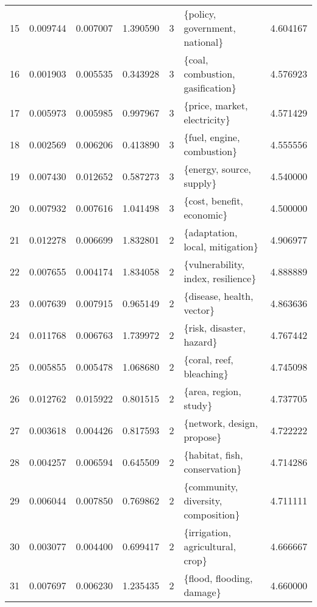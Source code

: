 \begin{tabular}{lrrrrlr}
15 &    0.009744 &  0.007007 &        1.390590 &           3 &          \{policy, government, national\} &  4.604167 \\
16 &    0.001903 &  0.005535 &        0.343928 &           3 &        \{coal, combustion, gasification\} &  4.576923 \\
17 &    0.005973 &  0.005985 &        0.997967 &           3 &            \{price, market, electricity\} &  4.571429 \\
18 &    0.002569 &  0.006206 &        0.413890 &           3 &              \{fuel, engine, combustion\} &  4.555556 \\
19 &    0.007430 &  0.012652 &        0.587273 &           3 &                \{energy, source, supply\} &  4.540000 \\
20 &    0.007932 &  0.007616 &        1.041498 &           3 &               \{cost, benefit, economic\} &  4.500000 \\
21 &    0.012278 &  0.006699 &        1.832801 &           2 &         \{adaptation, local, mitigation\} &  4.906977 \\
22 &    0.007655 &  0.004174 &        1.834058 &           2 &      \{vulnerability, index, resilience\} &  4.888889 \\
23 &    0.007639 &  0.007915 &        0.965149 &           2 &               \{disease, health, vector\} &  4.863636 \\
24 &    0.011768 &  0.006763 &        1.739972 &           2 &                \{risk, disaster, hazard\} &  4.767442 \\
25 &    0.005855 &  0.005478 &        1.068680 &           2 &                \{coral, reef, bleaching\} &  4.745098 \\
26 &    0.012762 &  0.015922 &        0.801515 &           2 &                   \{area, region, study\} &  4.737705 \\
27 &    0.003618 &  0.004426 &        0.817593 &           2 &              \{network, design, propose\} &  4.722222 \\
28 &    0.004257 &  0.006594 &        0.645509 &           2 &           \{habitat, fish, conservation\} &  4.714286 \\
29 &    0.006044 &  0.007850 &        0.769862 &           2 &     \{community, diversity, composition\} &  4.711111 \\
30 &    0.003077 &  0.004400 &        0.699417 &           2 &        \{irrigation, agricultural, crop\} &  4.666667 \\
31 &    0.007697 &  0.006230 &        1.235435 &           2 &               \{flood, flooding, damage\} &  4.660000 \\

\end{tabular}
